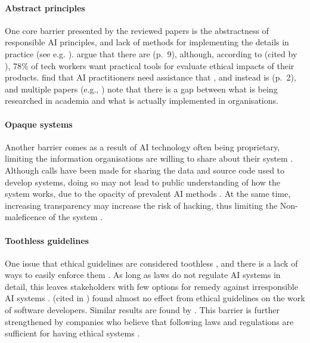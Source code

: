 \paragraph{Abstract principles}
One core barrier presented by the reviewed papers is the abstractness of responsible AI principles, and lack of methods for implementing the details in practice (see e.g. \cite{Jakesch_2022,Havrda_2020,BarredoArrieta_2020,Lukkien_2021}). \textcite{Gianni_2022} argue that there are  (p.~9), although, according to \textcite{Miller_2019_techworker} (cited by \cite{Morley_2020}), 78\% of tech workers want practical tools for evaluate ethical impacts of their products. \textcite{Morley_2021} find that AI practitioners need assistance that , and instead is  (p.~2), and multiple papers (e.g., \cite{Chen_2020,BarredoArrieta_2020,Rakova_2021}) note that there is a gap between what is being researched in academia and what is actually implemented in organisations.

\paragraph{Opaque systems}
Another barrier comes as a result of AI technology often being proprietary, limiting the information organisations are willing to share about their system \parencite{Buhmann_2021,Hacker_2022}. Although calls have been made for sharing the data and source code used to develop systems, doing so may not lead to public understanding of how the system works, due to the opacity of prevalent AI methods \parencite{Buhmann_2021,Siala_2022}. At the same time, increasing transparency may increase the risk of hacking, thus limiting the Non-maleficence of the system \parencite{Cheng_2021}.

\paragraph{Toothless guidelines}
One issue that ethical guidelines are considered toothless \parencite{Henriksen_2021}, and there is a lack of ways to easily enforce them \parencite{Liu_2021,Hagendorff_2020}. As long as laws do not regulate AI systems in detail, this leaves stakeholders with few options for remedy against irresponsible AI systems \parencite{Henriksen_2021}. \textcite{McNamara_2018_results} (cited in \cite{Nevanperä_2021}) found almost no effect from ethical guidelines on the work of software developers. Similar results are found by \textcite{Hagendorff_2020}. This barrier is further strengthened by companies who believe that following laws and regulations are sufficient for having ethical systems \parencite{Vakkuri_2022}. 


